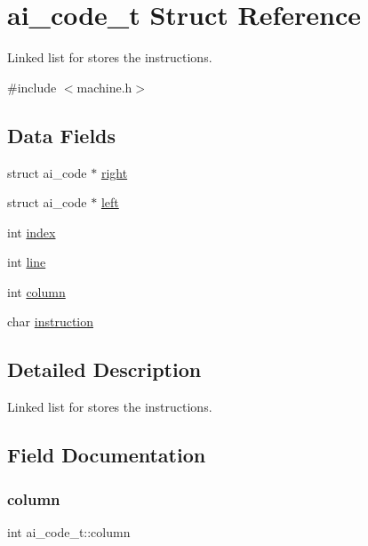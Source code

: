 \hypertarget{structai__code__t}{}\section{ai\+\_\+code\+\_\+t Struct Reference}
\label{structai__code__t}


Linked list for stores the instructions.  




{\ttfamily \#include $<$machine.\+h$>$}

\subsection*{Data Fields}
\begin{DoxyCompactItemize}
\item 
struct ai\+\_\+code $\ast$ \hyperlink{structai__code__t_a70f38fa9d58b3466eb324f5180971ab9}{right}
\item 
struct ai\+\_\+code $\ast$ \hyperlink{structai__code__t_aa8a13cde2bd2abb8cf099e05b754b3d1}{left}
\item 
int \hyperlink{structai__code__t_a0e9cedfb6ee5d16f6fc0effcb0e49f3c}{index}
\item 
int \hyperlink{structai__code__t_a0c317f27e8a3bb86a17ebadd8373b1f6}{line}
\item 
int \hyperlink{structai__code__t_ae38e27ea9f489fdac6b74e1a39eb0a6c}{column}
\item 
char \hyperlink{structai__code__t_a6d77dbac9ff028b9b6041ea451a5135a}{instruction}
\end{DoxyCompactItemize}


\subsection{Detailed Description}
Linked list for stores the instructions. 

\subsection{Field Documentation}
\mbox{\label{structai__code__t_ae38e27ea9f489fdac6b74e1a39eb0a6c}} 
\subsubsection{\texorpdfstring{column}{column}}
{\footnotesize\ttfamily int ai\+\_\+code\+\_\+t\+::column}

